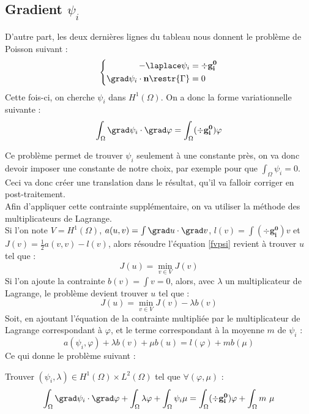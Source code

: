\subsection{Gradient $\psi_i$}
\label{multLagrange}
D'autre part, les deux dernières lignes du tableau nous donnent le problème de Poisson suivant :
\begin{equation*}
\left\{\begin{aligned}
-\laplace\psi_i &= \div \mathbf{g_i^0}\\
\grad\psi_i\cdot \mathbf{n}\restr{\Gamma} &= 0
\end{aligned}\right.
\end{equation*}
Cette fois-ci, on cherche $\psi_i$ dans $H^1(\Omega)$. On a donc la forme variationnelle suivante :
\begin{equation}\label{fvpsi}
\int_\Omega \grad\psi_i\cdot\grad\varphi = \int_\Omega (\div \mathbf{g_i^0})\varphi
\end{equation}

Ce problème permet de trouver $\psi_i$ seulement à une constante près, on va donc devoir imposer une constante de notre choix, par exemple pour que $\int_\Omega \psi_i = 0$. Ceci va donc créer une translation dans le résultat, qu'il va falloir corriger en post-traitement.\\
Afin d'appliquer cette contrainte supplémentaire, on va utiliser la méthode des multiplicateurs de Lagrange.\\
Si l'on note $V=H^1(\Omega)$, $a(u,v)=\int \grad u \cdot \grad v$, $l(v)=\int (\div \mathbf{g_i^0})v$ et $J(v)=\frac{1}{2}a(v,v)-l(v)$, alors résoudre l'équation \ref{fvpsi} revient à trouver $u$ tel que :
\[ J(u) = \min_{v\in V} J(v) \]
Si l'on ajoute la contrainte $b(v) = \int v = 0$, alors, avec $\lambda$ un multiplicateur de Lagrange, le problème devient trouver $u$ tel que :
\[ J(u) = \min_{v\in V} J(v) - \lambda b(v) \]
Soit, en ajoutant l'équation de la contrainte multipliée par le multiplicateur de Lagrange correspondant à $\varphi$, et le terme correspondant à la moyenne $m$ de $\psi_i$ :
\[ a(\psi_i,\varphi) + \lambda b(v) + \mu b(u) = l(\varphi) + m b(\mu) \]
Ce qui donne le problème suivant :
\begin{pb}\label{fvpsiml}
Trouver $(\psi_i,\lambda)\in H^1(\Omega)\times L^2(\Omega)$ tel que $\forall (\varphi,\mu)$ :
\begin{equation*}
\int_\Omega \grad\psi_i\cdot\grad\varphi + \int_\Omega \lambda\varphi + \int_\Omega \psi_i\mu = \int_\Omega (\div \mathbf{g_i^0})\varphi + \int_\Omega m\ \mu
\end{equation*}\end{pb}

